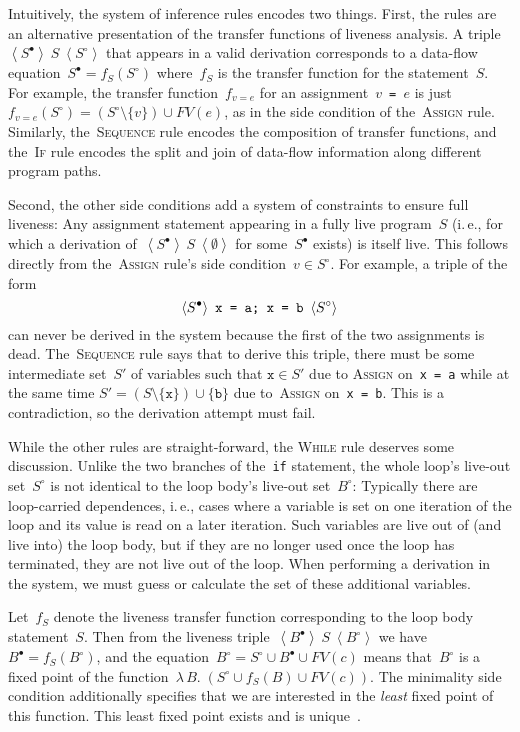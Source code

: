 \documentclass{llncs}
\newcommand{\liveout}[1]{\ensuremath{#1^{\circ}}}
\newcommand{\livein}[1]{\ensuremath{#1^{\bullet}}}
\newcommand{\triple}[3]{\ensuremath{
    \left\langle#1\right\rangle \ #2 \ \left\langle#3\right\rangle
}}
\def\union{\cup}
\begin{document}
Intuitively, the system of inference rules encodes two things. First, the
rules are an alternative presentation of the transfer functions of liveness
analysis. A triple~\(\triple{\livein{S}}{S}{\liveout{S}}\) that appears in a
valid derivation corresponds to a data-flow equation~\(\livein{S} =
f_S(\liveout{S})\) where~\(f_S\) is the transfer function for the
statement~\(S\). For example, the transfer function~\(f_{v = e}\) for an
assignment~\(v\)\verb| = |\(e\) is just~\(f_{v = e}(\liveout{S}) =
(\liveout{S} \setminus \{v\}) \union FV(e)\), as in the side condition of
the~\textsc{Assign} rule. Similarly, the~\textsc{Sequence} rule encodes the
composition of transfer functions, and the~\textsc{If} rule encodes the
split and join of data-flow information along different program paths.

Second, the other side conditions add a system of constraints to ensure full
liveness: Any assignment statement appearing in a fully live program~\(S\)
(i.\,e., for which a derivation of~\(\triple{\livein{S}}{S}{\emptyset}\) for
some~\(\livein{S}\) exists) is itself live. This follows directly from
the~\textsc{Assign} rule's side condition~\(v \in \liveout{S}\).
For example, a triple of the form
\[
\triple{\livein{S}}{\mbox{\texttt{x = a; x = b}}}{\liveout{S}}
\]
can never be derived in the system because the first of the two assignments
is dead. The~\textsc{Sequence} rule says that to derive this triple, there
must be some intermediate set~\(S'\) of variables such that \(\mathtt{x} \in
S'\) due to \textsc{Assign} on~\verb|x = a| while at the same time
\(S' = (S \setminus \{\mathtt{x}\}) \union \{\mathtt{b}\}\) due
to~\textsc{Assign} on~\verb|x = b|. This is a contradiction, so the
derivation attempt must fail.

While the other rules are straight-forward, the \textsc{While} rule deserves
some discussion. Unlike the two branches of the~\verb|if| statement, the
whole loop's live-out set~\(\liveout{S}\) is not identical to the loop
body's live-out set~\(\liveout{B}\): Typically there are loop-carried
dependences, i.\,e., cases where a variable is set on one iteration of the
loop and its value is read on a later iteration. Such variables are live out
of (and live into) the loop body, but if they are no longer used once the
loop has terminated, they are not live out of the loop. When performing a
derivation in the system, we must guess or calculate the set of these
additional variables.

Let~\(f_S\) denote the liveness transfer
function corresponding to the loop body statement~\(S\). Then from the
liveness triple~\(\triple{\livein{B}}{S}{\liveout{B}}\) we have~\(\livein{B}
= f_S(\liveout{B})\), and the equation~\(\liveout{B} = \liveout{S} \union
\livein{B} \union FV(c)\) means that~\(\liveout{B}\) is a fixed point of the
function~\(\lambda\,B.\;(\liveout{S} \union f_S(B) \union FV(c))\). The
minimality side condition additionally specifies that we are interested in
the \emph{least} fixed point of this function. This least fixed point exists
and is unique~\cite{nielson.etal-1999}.
\end{document}
